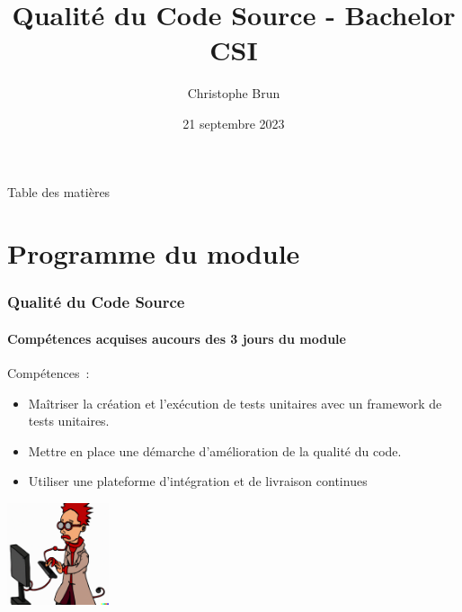 \documentclass{beamer}
\title{Qualité du Code Source - Bachelor CSI}
\author{Christophe Brun}
\institute{Campus Saint-Michel IT}
\date{21 septembre 2023}
\begin{document}
    \begin{frame}
        \transdissolve
        \titlepage
    \end{frame}

    \begin{frame}{Table des matières}
        \tableofcontents
    \end{frame}


    \section{Programme du module}\label{sec:programme-du-module}
    \begin{frame}
        \frametitle{Qualité du Code Source}
        \framesubtitle{Compétences acquises aucours des 3 jours du module}
        \transdissolve
        Compétences~:
        \begin{itemize}
            \item Maîtriser la création et l’exécution de tests unitaires avec un framework de tests unitaires.
            \item Mettre en place une démarche d’amélioration de la qualité du code.
            \item Utiliser une plateforme d’intégration et de livraison continues

        \end{itemize}
        \centering
        \includegraphics[width=3cm]{image/funny-cartoon-of-a-smart-young-computer-scientist.png}
    \end{frame}
\end{document}
